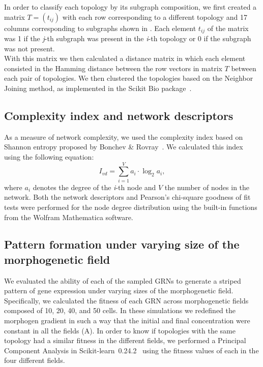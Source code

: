 \documentclass[10pt,letterpaper]{article}
\begin{document}
In order to classify each topology by its subgraph composition, we first created
a matrix  $T = (t_{ij})$ with each row corresponding to a different topology
and 17 columns corresponding to subgraphs shown in .
Each element $t_{ij}$ of
the matrix was 1 if the \emph{j}-th subgraph was present in the \emph{i}-th
topology or 0 if the subgraph was not present.\\

With this matrix we then calculated a distance matrix in which each element
consisted in the Hamming distance between the row vectors in matrix $T$ between
each pair of topologies. We then clustered the topologies based on the
Neighbor Joining method, as implemented in the Scikit Bio
package~\cite{skbio2020}.

\subsection*{Complexity index and network descriptors}

As a measure of network complexity, we used the complexity index based on
Shannon entropy proposed by Bonchev \& Rovray~\cite{D.2005}. We calculated this
index using the following equation:
\begin{equation}
 I_{vd} = \sum_{i=1}^V a_i \cdot \log_{2} a_i,
\end{equation}
\noindent
where $a_i$ denotes the degree of the \emph{i}-th node and $V$ the number of
nodes in the network. Both the network descriptors and Pearson’s chi-square
goodness of fit tests were performed for the node degree distribution using
the built-in functions from the Wolfram Mathematica software.\\

\subsection*{Pattern formation under varying size of the morphogenetic field}
We evaluated the ability of each of the sampled GRNs to generate a striped
pattern of gene expression under varying sizes of the morphogenetic field.
Specifically, we calculated the fitness of each GRN across morphogenetic fields
composed of 10, 20, 40, and 50 cells. In these simulations we redefined the
morphogen gradient in such a way that the initial and final concentration were
constant in all the fields (A). In order to know if topologies
with the same topology had a similar fitness in the different fields, we performed
a Principal Component Analysis in Scikit-learn~0.24.2~\cite{sklearn} using the
fitness values of each in the four different fields.
\end{document}

